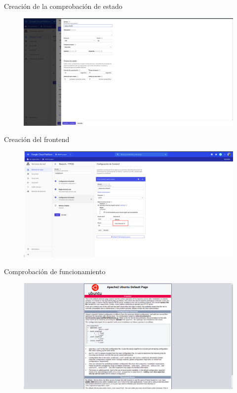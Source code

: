 \documentclass{beamer}
\begin{document}
\begin{frame}[fragile]{Creación de la comprobación de estado}
  \begin{figure}[H]
		\centering
		\includegraphics[width=\textwidth]{project/status_check.png}
	\end{figure}
\end{frame}

\begin{frame}[fragile]{Creación del frontend}
  \begin{figure}[H]
		\centering
		\includegraphics[width=\textwidth]{project/frontend.png}
	\end{figure}
\end{frame}

\begin{frame}[fragile]{Comprobación de funcionamiento}
  \begin{figure}[H]
		\centering
		\includegraphics[width=\textwidth]{project/load_balancer_ok.png}
	\end{figure}
\end{frame}
\end{document}
